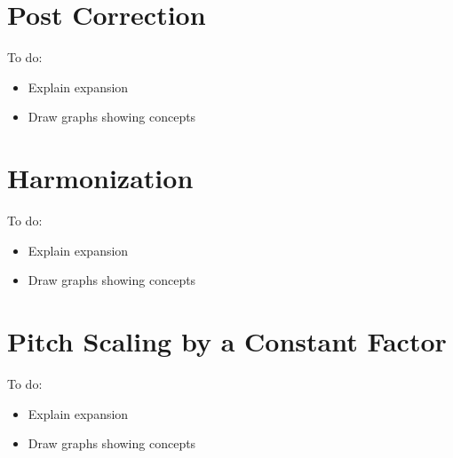 
\section{Post Correction}

\color{red}
To do:
\begin{itemize}
	\item Explain expansion
	\item Draw graphs showing concepts
\end{itemize}
\color{black}

\section{Harmonization}

\color{red}
To do:
\begin{itemize}
	\item Explain expansion
	\item Draw graphs showing concepts
\end{itemize}
\color{black}

\section{Pitch Scaling by a Constant Factor}

\color{red}
To do:
\begin{itemize}
	\item Explain expansion
	\item Draw graphs showing concepts
\end{itemize}
\color{black}
